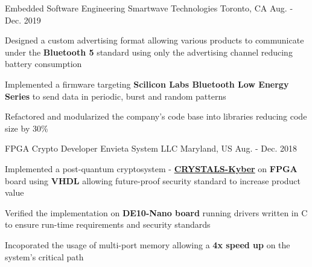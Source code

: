 


\begin{cventries}


\cventry
{Embedded Software Engineering} %
{Smartwave Technologies} %
{Toronto, CA} %
{Aug. - Dec. 2019} %
{ %
\begin{cvitems}
\item {
    Designed a custom advertising format allowing
    various products to communicate under the 
    \textbf{Bluetooth 5} standard using only the advertising channel
    reducing battery consumption 
}
\item {
    Implemented a firmware targeting
    \textbf{Scilicon Labs Bluetooth Low Energy Series}
    to send data in periodic, burst and random patterns
}
\item {
    Refactored and modularized the company's code base 
    into libraries reducing code size by 30\%
}
\end{cvitems}
}


\cventry
{FPGA Crypto Developer} %
{Envieta System LLC} %
{Maryland, US} %
{Aug. - Dec. 2018} %
{ %
\begin{cvitems}
\item {
    Implemented a post-quantum cryptosystem - 
    \textbf{\href{https://pq-crystals.org/}{CRYSTALS-Kyber}} 
    on \textbf{FPGA} board using \textbf{VHDL} allowing
    future-proof security standard to increase product value
}
\item {
    Verified the implementation on 
    \textbf{DE10-Nano board} running drivers 
    written in C to ensure run-time requirements 
    and security standards
}
\item {
    Incoporated the usage of multi-port memory allowing 
    a \textbf{4x speed up} on the system’s critical path
}
\end{cvitems}
}


\end{cventries}
